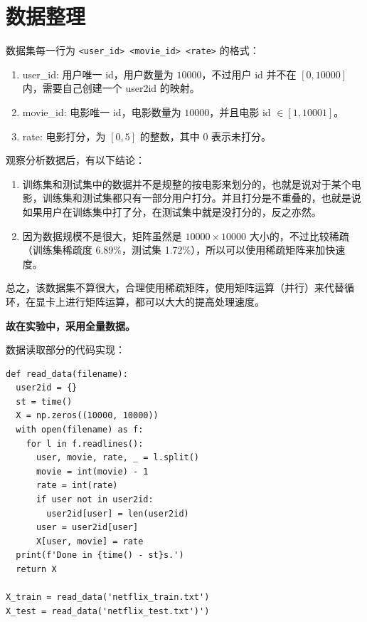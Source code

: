 \documentclass[degree=project,degree-type=project]{thuthesis}
\begin{document}
\maketitle

\frontmatter
% 

\tableofcontents

\mainmatter

\chapter{数据整理}

数据集每一行为 \texttt{<user\_id> <movie\_id> <rate>} 的格式：

\begin{enumerate}
  \item user\_id: 用户唯一 id，用户数量为 $10000$，不过用户 id 并不在 $[0, 10000]$ 内，需要自己创建一个 user2id 的映射。
  \item movie\_id: 电影唯一 id，电影数量为 $10000$，并且电影 id $\in [1, 10001]$。
  \item rate: 电影打分，为 $[0, 5]$ 的整数，其中 $0$ 表示未打分。
\end{enumerate}

观察分析数据后，有以下结论：

\begin{enumerate}
  \item 训练集和测试集中的数据并不是规整的按电影来划分的，也就是说对于某个电影，训练集和测试集都只有一部分用户打分。并且打分是不重叠的，也就是说如果用户在训练集中打了分，在测试集中就是没打分的，反之亦然。
  \item 因为数据规模不是很大，矩阵虽然是 $10000 \times 10000$ 大小的，不过比较稀疏（训练集稀疏度 6.89\%，测试集 1.72\%），所以可以使用稀疏矩阵来加快速度。
\end{enumerate}

总之，该数据集不算很大，合理使用稀疏矩阵，使用矩阵运算（并行）来代替循环，在显卡上进行矩阵运算，都可以大大的提高处理速度。

\textbf{故在实验中，采用全量数据。}

数据读取部分的代码实现：

  \begin{verbatim}
def read_data(filename):
  user2id = {}
  st = time()
  X = np.zeros((10000, 10000))
  with open(filename) as f:
    for l in f.readlines():
      user, movie, rate, _ = l.split()
      movie = int(movie) - 1
      rate = int(rate)
      if user not in user2id:
        user2id[user] = len(user2id)
      user = user2id[user]
      X[user, movie] = rate
  print(f'Done in {time() - st}s.')
  return X

X_train = read_data('netflix_train.txt')
X_test = read_data('netflix_test.txt')')
  \end{verbatim}
\end{document}
